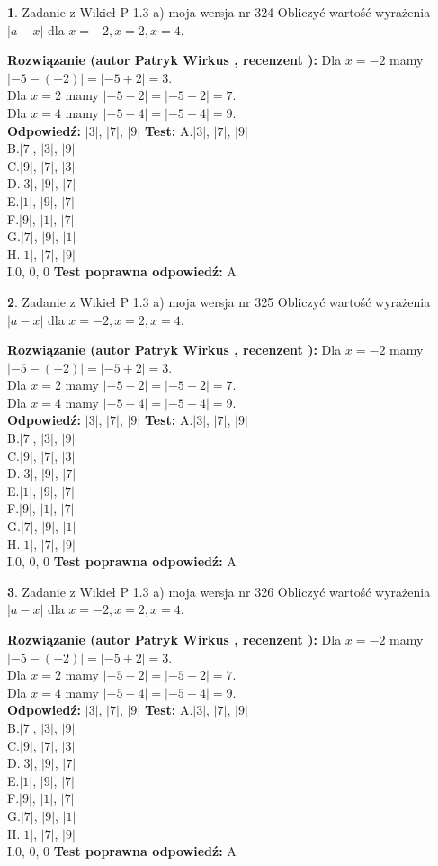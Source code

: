 \documentclass[12pt, a4paper]{article}
\theoremstyle{definition} %
\newtheorem{zad}{}
\newcommand{\zadStart}[1]{\begin{zad}#1\newline}
\newcommand{\zadStop}{\end{zad}}
\newcommand{\rozwStart}[2]{\noindent \textbf{Rozwiązanie (autor #1 , recenzent #2): }\newline}
\newcommand{\rozwStop}{\newline}
\newcommand{\odpStart}{\noindent \textbf{Odpowiedź:}\newline}
\newcommand{\odpStop}{\newline}
\newcommand{\testStart}{\noindent \textbf{Test:}\newline}
\newcommand{\testStop}{\newline}
\newcommand{\kluczStart}{\noindent \textbf{Test poprawna odpowiedź:}\newline}
\newcommand{\kluczStop}{\newline}
\begin{document}
\zadStart{Zadanie z Wikieł P 1.3 a) moja wersja nr 324}
Obliczyć wartość wyrażenia $|a - x|$ dla $x=-2,x=2,x=4$.
\zadStop
\rozwStart{Patryk Wirkus}{}
Dla $x = -2$ mamy $|-5 - (-2)| = |-5 + 2| = 3$.\\
Dla $x = 2$ mamy $|-5 - 2| = |-5 - 2| = 7$.\\
Dla $x = 4$ mamy $|-5 - 4| = |-5 - 4| = 9$.\\
\rozwStop
\odpStart
$|3|$, $|7|$, $|9|$
\odpStop
\testStart
A.$|3|$, $|7|$, $|9|$\\
B.$|7|$, $|3|$, $|9|$\\
C.$|9|$, $|7|$, $|3|$\\
D.$|3|$, $|9|$, $|7|$\\
E.$|1|$, $|9|$, $|7|$\\
F.$|9|$, $|1|$, $|7|$\\
G.$|7|$, $|9|$, $|1|$\\
H.$|1|$, $|7|$, $|9|$\\
I.$0$, $0$, $0$
\testStop
\kluczStart
A
\kluczStop



\zadStart{Zadanie z Wikieł P 1.3 a) moja wersja nr 325}
Obliczyć wartość wyrażenia $|a - x|$ dla $x=-2,x=2,x=4$.
\zadStop
\rozwStart{Patryk Wirkus}{}
Dla $x = -2$ mamy $|-5 - (-2)| = |-5 + 2| = 3$.\\
Dla $x = 2$ mamy $|-5 - 2| = |-5 - 2| = 7$.\\
Dla $x = 4$ mamy $|-5 - 4| = |-5 - 4| = 9$.\\
\rozwStop
\odpStart
$|3|$, $|7|$, $|9|$
\odpStop
\testStart
A.$|3|$, $|7|$, $|9|$\\
B.$|7|$, $|3|$, $|9|$\\
C.$|9|$, $|7|$, $|3|$\\
D.$|3|$, $|9|$, $|7|$\\
E.$|1|$, $|9|$, $|7|$\\
F.$|9|$, $|1|$, $|7|$\\
G.$|7|$, $|9|$, $|1|$\\
H.$|1|$, $|7|$, $|9|$\\
I.$0$, $0$, $0$
\testStop
\kluczStart
A
\kluczStop



\zadStart{Zadanie z Wikieł P 1.3 a) moja wersja nr 326}
Obliczyć wartość wyrażenia $|a - x|$ dla $x=-2,x=2,x=4$.
\zadStop
\rozwStart{Patryk Wirkus}{}
Dla $x = -2$ mamy $|-5 - (-2)| = |-5 + 2| = 3$.\\
Dla $x = 2$ mamy $|-5 - 2| = |-5 - 2| = 7$.\\
Dla $x = 4$ mamy $|-5 - 4| = |-5 - 4| = 9$.\\
\rozwStop
\odpStart
$|3|$, $|7|$, $|9|$
\odpStop
\testStart
A.$|3|$, $|7|$, $|9|$\\
B.$|7|$, $|3|$, $|9|$\\
C.$|9|$, $|7|$, $|3|$\\
D.$|3|$, $|9|$, $|7|$\\
E.$|1|$, $|9|$, $|7|$\\
F.$|9|$, $|1|$, $|7|$\\
G.$|7|$, $|9|$, $|1|$\\
H.$|1|$, $|7|$, $|9|$\\
I.$0$, $0$, $0$
\testStop
\kluczStart
A
\kluczStop
\end{document}
